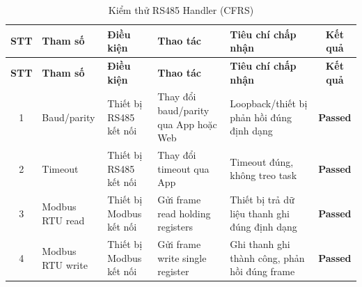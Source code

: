         \begin{longtable}{|c|p{2cm}|p{2.5cm}|p{3.5cm}|p{4cm}|c|}
            \caption{Kiểm thử RS485 Handler (CFRS)}
            \label{tab:test_rs485_handler} \\
            \hline
            \textbf{STT} & \textbf{Tham số} & \textbf{Điều kiện} & \textbf{Thao tác} & \textbf{Tiêu chí chấp nhận} & \textbf{Kết quả} \\ \hline
            \endfirsthead
            \hline
            \textbf{STT} & \textbf{Tham số} & \textbf{Điều kiện} & \textbf{Thao tác} & \textbf{Tiêu chí chấp nhận} & \textbf{Kết quả} \\ \hline
            \endhead
            \hline
            \endfoot
            \endlastfoot
        
            1 & Baud/parity & Thiết bị RS485 kết nối & Thay đổi baud/parity qua App hoặc Web & Loopback/thiết bị phản hồi đúng định dạng & \textcolor{modern_blue}{\textbf{Passed}} \\ \hline
            2 & Timeout & Thiết bị RS485 kết nối & Thay đổi timeout qua App & Timeout đúng, không treo task & \textcolor{modern_blue}{\textbf{Passed}} \\ \hline
            3 & Modbus RTU read & Thiết bị Modbus kết nối & Gửi frame read holding registers & Thiết bị trả dữ liệu thanh ghi đúng định dạng & \textcolor{modern_blue}{\textbf{Passed}} \\ \hline
            4 & Modbus RTU write & Thiết bị Modbus kết nối & Gửi frame write single register & Ghi thanh ghi thành công, phản hồi đúng frame & \textcolor{modern_blue}{\textbf{Passed}} \\ \hline
        \end{longtable}
        
